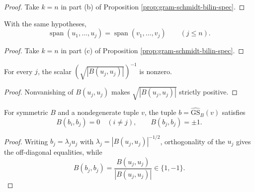 \begin{proof}
\leanok
{}
\sketch Take $k=n$ in part (b) of Proposition
\ref{prop:gram-schmidt-bilin-spec}.
\end{proof}

\begin{lemma}
\label{lem:gram-schmidt-bilin-flag}
\leanok
{}
With the same hypotheses,
\[
\operatorname{span}(u_1,\ldots,u_j)=\operatorname{span}(v_1,\ldots,v_j)
\qquad(j\leq n).
\]
\end{lemma}

\begin{proof}
\leanok
{}
\sketch Take $k=n$ in part (c) of Proposition
\ref{prop:gram-schmidt-bilin-spec}.
\end{proof}

\begin{lemma}
\label{lem:gram-schmidt-bilin-normalizer-ne-zero}
\leanok
{}
For every $j$, the scalar $(\sqrt{|B(u_j,u_j)|})^{-1}$ is nonzero.
\end{lemma}

\begin{proof}
\leanok
{}
\sketch Nonvanishing of $B(u_j,u_j)$ makes $\sqrt{|B(u_j,u_j)|}$ strictly
positive.
\end{proof}

\begin{proposition}
\label{prop:gram-schmidt-bilin-orthonormal}
\leanok
{}
For symmetric $B$ and a nondegenerate tuple $v$, the tuple
$b=\widehat{\mathrm{GS}}_B(v)$ satisfies
\[
B(b_i,b_j)=0\quad(i\ne j),
\qquad B(b_j,b_j)=\pm1.
\]
\end{proposition}

\begin{proof}
\leanok
{}
\sketch Writing $b_j=\lambda_ju_j$ with
$\lambda_j=|B(u_j,u_j)|^{-1/2}$, orthogonality of the $u_j$ gives the off-diagonal
equalities, while
\[
B(b_j,b_j)=\frac{B(u_j,u_j)}{|B(u_j,u_j)|}\in\{1,-1\}.
\]
\end{proof}

